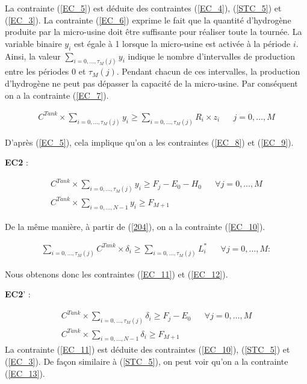 La contrainte (\ref{EC_5}) est déduite des contraintes (\ref{EC_4}), (\ref{STC_5}) et (\ref{EC_3}). La contrainte (\ref{EC_6}) exprime le fait que la quantité d'hydrogène produite par la micro-usine doit être suffisante pour réaliser toute la tournée.
La variable binaire $y_i$ est égale à 1 lorsque la micro-usine est activée à la période $i$. Ainsi, la valeur $\sum_{i=0, \dots, \tau_M(j)} y_i$ indique le nombre d'intervalles de production entre les périodes 0 et $\tau_M(j)$.
Pendant chacun de ces intervalles, la production d'hydrogène ne peut pas dépasser la capacité de la micro-usine.
Par conséquent on a la contrainte (\ref{EC_7}).

\begin{equation}
\begin{align}
\label{EC_7}
C^{Tank}\times \sum_{i=0,\dots, \tau_M(j)} y_i \geq
\sum_{i=0, \dots, \tau_M(j)} R_i \times z_i &  & j = 0 , \dots, M
\end{align} 
\end{equation}

D'après (\ref{EC_5}), cela implique qu'on a les contraintes (\ref{EC_8}) et (\ref{EC_9}).

\textbf{EC2} :

\begin{subequations}
\begin{align}
\label{EC_8}
C^{Tank} \times \sum_{i=0, \dots, \tau_M(j)}
y_i \geq F_j-E_0-H_0 &  & \forall j = 0 , \dots, M \\
\label{EC_9}
C^{Tank} \times \sum_{i=0, \dots, N-1} y_i \geq F_{M+1}  &  &
\end{align}
\end{subequations}

De la même manière, à partir de (\ref{204}), on a la contrainte (\ref{EC_10}).

\begin{equation}
\begin{align}
\label{EC_10}
\sum_{i=0, \dots, \tau_M(j)}  C^{Tank} \times \delta_i \geq \sum_{i=0, \dots, \tau_M(j)} L_i^*&  & \forall j = 0 , \dots, M :
\end{align} 
\end{equation}

Nous obtenons donc les contraintes (\ref{EC_11}) et (\ref{EC_12}).

\textbf{EC2}' :

\begin{subequations}
\begin{align}
\label{EC_11}
C^{Tank} \times \sum_{i=0, \dots, \tau_M(j)} \delta_i \geq F_j- E_0 &  & \forall j = 0, \dots, M \\
\label{EC_12}
C^{Tank} \times \sum_{i=0, \dots, N-1} \delta_i \geq F_{M+1} &  &
\end{align}
\end{subequations}
La contrainte (\ref{EC_11}) est déduite des contraintes (\ref{EC_10}), (\ref{STC_5}) et (\ref{EC_3}). 
De façon similaire à (\ref{STC_5}), on peut voir qu'on a la contrainte (\ref{EC_13}).

